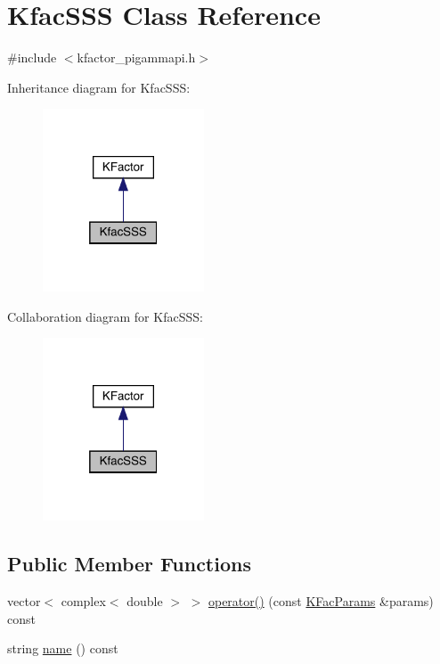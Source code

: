 \hypertarget{classKfacSSS}{}\section{Kfac\+S\+SS Class Reference}
\label{classKfacSSS}


{\ttfamily \#include $<$kfactor\+\_\+pigammapi.\+h$>$}



Inheritance diagram for Kfac\+S\+SS\+:\nopagebreak
\begin{figure}[H]
\begin{center}
\leavevmode
\includegraphics[width=136pt]{db/d34/classKfacSSS__inherit__graph}
\end{center}
\end{figure}


Collaboration diagram for Kfac\+S\+SS\+:\nopagebreak
\begin{figure}[H]
\begin{center}
\leavevmode
\includegraphics[width=136pt]{d6/dad/classKfacSSS__coll__graph}
\end{center}
\end{figure}
\subsection*{Public Member Functions}
\begin{DoxyCompactItemize}
\item 
vector$<$ complex$<$ double $>$ $>$ \mbox{\hyperlink{classKfacSSS_a25ca7daf4005bf951ad67d568e3f3936}{operator()}} (const \mbox{\hyperlink{classKFacParams}{K\+Fac\+Params}} \&params) const
\item 
string \mbox{\hyperlink{classKfacSSS_a2c22369b8bb0ac1be72f981c8c119719}{name}} () const
\end{DoxyCompactItemize}


